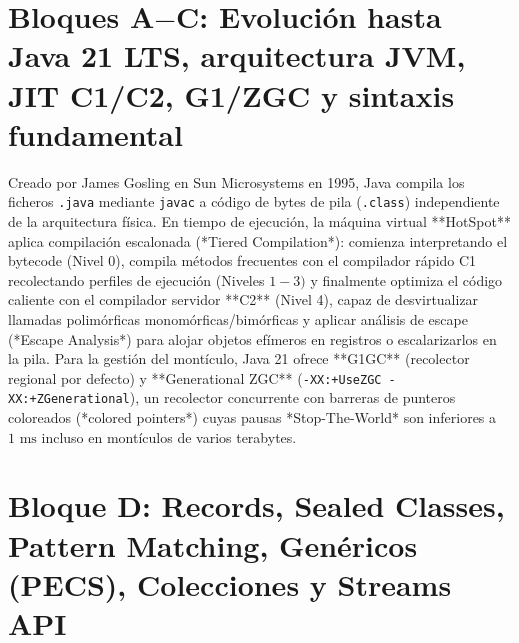 \documentclass{book}
\begin{document}
\section{Bloques A\(-\)C: Evolución hasta Java 21 LTS, arquitectura JVM, JIT C1/C2, G1/ZGC y sintaxis fundamental}

Creado por James Gosling en Sun Microsystems en 1995, Java compila los ficheros \texttt{.java} mediante \texttt{javac} a código de bytes de pila (\texttt{.class}) independiente de la arquitectura física. En tiempo de ejecución, la máquina virtual **HotSpot** aplica compilación escalonada (*Tiered Compilation*): comienza interpretando el bytecode (Nivel 0), compila métodos frecuentes con el compilador rápido C1 recolectando perfiles de ejecución (Niveles \(1-3)\) y finalmente optimiza el código caliente con el compilador servidor **C2** (Nivel 4), capaz de desvirtualizar llamadas polimórficas monomórficas/bimórficas y aplicar análisis de escape (*Escape Analysis*) para alojar objetos efímeros en registros o escalarizarlos en la pila. Para la gestión del montículo, Java 21 ofrece **G1GC** (recolector regional por defecto) y **Generational ZGC** (\texttt{-XX:+UseZGC -XX:+ZGenerational}), un recolector concurrente con barreras de punteros coloreados (*colored pointers*) cuyas pausas *Stop-The-World* son inferiores a \(1\text{ ms}\) incluso en montículos de varios terabytes.

\section{Bloque D: Records, Sealed Classes, Pattern Matching, Genéricos (PECS), Colecciones y Streams API}
\end{document}
